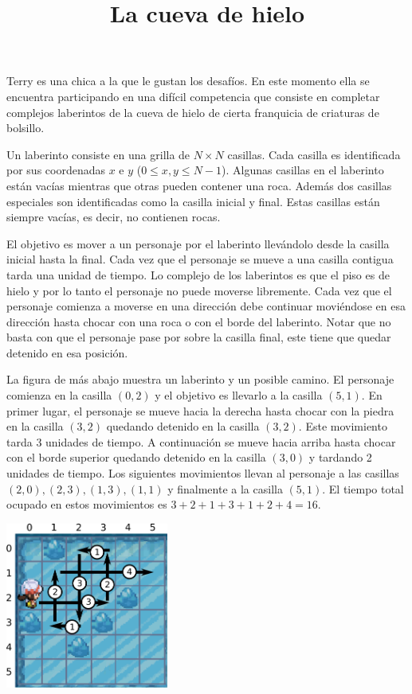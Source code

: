 \documentclass{oci}
\title{La cueva de hielo}
\begin{document}
\maketitle
  Terry es una chica a la que le gustan los desafíos.
En este momento ella se encuentra participando en una difícil competencia que consiste en completar complejos laberintos de la cueva de hielo de cierta franquicia de criaturas de bolsillo.

Un laberinto consiste en una grilla de $N\times N$ casillas.
Cada casilla es identificada por sus coordenadas $x$ e $y$ ($0\leq x,y \leq N-1$).
Algunas casillas en el laberinto están vacías mientras que otras pueden contener una roca.
Además dos casillas especiales son identificadas como la casilla inicial y final.
Estas casillas están siempre vacías, es decir, no contienen rocas.

El objetivo es mover a un personaje por el laberinto llevándolo desde la casilla inicial hasta la final.
Cada vez que el personaje se mueve a una casilla contigua tarda una unidad de tiempo.
Lo complejo de los laberintos es que el piso es de hielo y por lo tanto el personaje no puede moverse libremente.
Cada vez que el personaje comienza a moverse en una dirección debe continuar moviéndose en esa dirección hasta chocar con una roca o con el borde del laberinto.
Notar que no basta con que el personaje pase por sobre la casilla final, este tiene que quedar detenido en esa posición.

La figura de más abajo muestra un laberinto y un posible camino.
El personaje comienza en la casilla $(0, 2)$ y el objetivo es llevarlo a la casilla $(5,1)$.
En primer lugar, el personaje se mueve hacia la derecha hasta chocar con la piedra en la casilla $(3,2)$ quedando detenido en la casilla $(3,2)$.
Este movimiento tarda 3 unidades de tiempo.
A continuación se mueve hacia arriba hasta chocar con el borde superior quedando detenido en la casilla $(3,0)$ y tardando 2 unidades de tiempo.
Los siguientes movimientos llevan al personaje a las casillas $(2,0), (2,3), (1,3), (1,1)$ y finalmente a la casilla $(5,1)$.
El tiempo total ocupado en estos movimientos es $3+2+1+3+1+2+4=16$.

\begin{center}
	\includegraphics[width=0.4\textwidth]{Icepath2-arrows.png}
\end{center}
\end{document}

